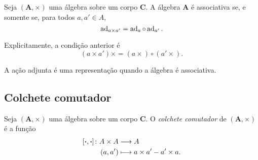 \begin{exercise}
Seja $(\bm A,\times)$ uma álgebra sobre um corpo $\bm C$. A álgebra $\bm A$ é associativa se, e somente se, para todos $a,a' \in A$,
	\begin{equation*}
	\operatorname{ad}_{a \times a'} = \operatorname{ad}_a \circ \operatorname{ad}_{a'}.
	\end{equation*}
\end{exercise}
Explicitamente, a condição anterior é
	\begin{equation*}
	(a \times a') \times = (a \times) \circ (a' \times).
	\end{equation*}

A ação adjunta é uma representação quando a álgebra é associativa.

\subsection{Colchete comutador}

\begin{definition}
Seja $(\bm A,\times)$ uma álgebra sobre um corpo $\bm C$. O \emph{colchete comutador} de $(\bm A,\times)$ é a função
	\begin{align*}
	{\left[{\bm{\cdot}},{\bm{\cdot}}\right]}\colon {A \times A} &\longrightarrow {A} \\{(a,a')} &\longmapsto a \times a' - a' \times a.
	\end{align*}
\end{definition}

